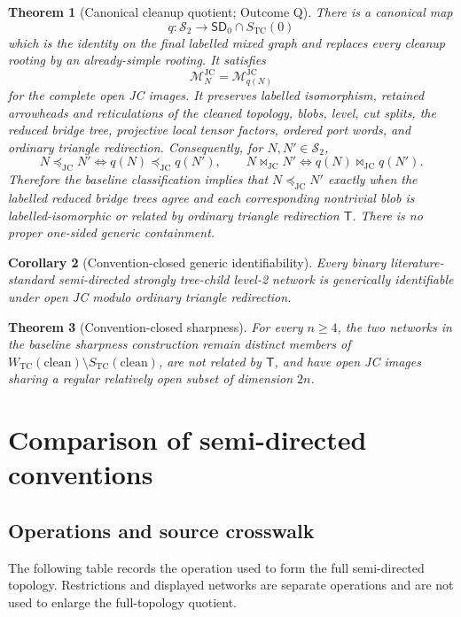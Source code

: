 \documentclass[11pt]{article}
\newtheorem{theorem}{Theorem}[section]
\newtheorem{corollary}[theorem]{Corollary}
\theoremstyle{remark}\newtheorem{remark}[theorem]{Remark}
\newcommand{\sdz}{\mathsf{SD}_0}
\newcommand{\STC}{S_{\mathrm{TC}}}
\newcommand{\WTC}{W_{\mathrm{TC}}}
\newcommand{\JC}{\mathrm{JC}}
\newcommand{\M}{\mathcal M}
\newcommand{\preceqjc}{\preceq_{\!\JC}}
\newcommand{\bowtiejc}{\mathbin{\bowtie}_{\!\JC}}
\newcommand{\Tmove}{\mathsf T}
\begin{document}
\begin{theorem}[Canonical cleanup quotient; Outcome Q]\label{thm:Q}
There is a canonical map
\[
q:\mathcal S_2\longrightarrow \sdz\cap\STC(0)
\]
which is the identity on the final labelled mixed graph and replaces every cleanup rooting by an already-simple rooting.  It satisfies
\[
\M_N^{\JC}=\M_{q(N)}^{\JC}
\]
for the complete open JC images.  It preserves labelled isomorphism, retained arrowheads and reticulations of the cleaned topology, blobs, level, cut splits, the reduced bridge tree, projective local tensor factors, ordered port words, and ordinary triangle redirection.  Consequently, for $N,N'\in\mathcal S_2$,
\[
N\preceqjc N'\iff q(N)\preceqjc q(N'),
\qquad
N\bowtiejc N'\iff q(N)\bowtiejc q(N').
\]
Therefore the baseline classification implies that $N\preceqjc N'$ exactly when the labelled reduced bridge trees agree and each corresponding nontrivial blob is labelled-isomorphic or related by ordinary triangle redirection $\Tmove$.  There is no proper one-sided generic containment.
\end{theorem}

\begin{corollary}[Convention-closed generic identifiability]\label{cor:genericQ}
Every binary literature-standard semi-directed strongly tree-child level-2 network is generically identifiable under open JC modulo ordinary triangle redirection.
\end{corollary}

\begin{theorem}[Convention-closed sharpness]\label{thm:sharpQ}
For every $n\ge4$, the two networks in the baseline sharpness construction remain distinct members of $\WTC(\mathrm{clean})\setminus\STC(\mathrm{clean})$, are not related by $\Tmove$, and have open JC images sharing a regular relatively open subset of dimension $2n$.
\end{theorem}

\section{Comparison of semi-directed conventions}
\subsection{Operations and source crosswalk}
The following table records the operation used to form the full semi-directed topology.  Restrictions and displayed networks are separate operations and are not used to enlarge the full-topology quotient.
\end{document}
